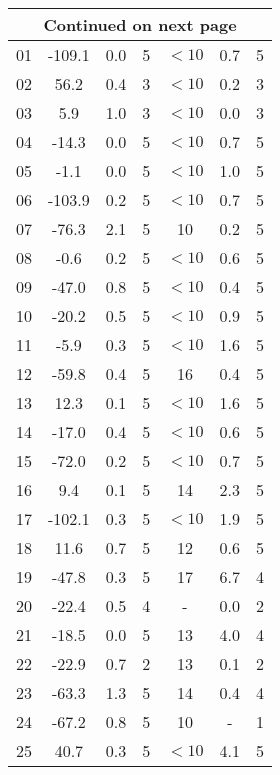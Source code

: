 \begin{longtable}{ccccccc}
\hline \multicolumn{7}{c}{{Continued on next page}} \\ \hline
\endfoot
\hline \hline
\endfoot
\rowcolor[gray]{0.9} 01 & -109.1 & 0.0 & 5 & $<10$ & 0.7 & 5\\
\rowcolor[gray]{0.9} 02 & 56.2 & 0.4 & 3 & $<10$ & 0.2 & 3\\
\rowcolor[gray]{0.9} 03 & 5.9 & 1.0 & 3 & $<10$ & 0.0 & 3\\
\rowcolor[gray]{0.9} 04 & -14.3 & 0.0 & 5 & $<10$ & 0.7 & 5\\
\rowcolor[gray]{0.9} 05 & -1.1 & 0.0 & 5 & $<10$ & 1.0 & 5\\
\rowcolor[gray]{0.9} 06 & -103.9 & 0.2 & 5 & $<10$ & 0.7 & 5\\
\rowcolor[gray]{0.9} 07 & -76.3 & 2.1 & 5 & 10 & 0.2 & 5\\
\rowcolor[gray]{0.9} 08 & -0.6 & 0.2 & 5 & $<10$ & 0.6 & 5\\
\rowcolor[gray]{0.9} 09 & -47.0 & 0.8 & 5 & $<10$ & 0.4 & 5\\
\rowcolor[gray]{0.9} 10 & -20.2 & 0.5 & 5 & $<10$ & 0.9 & 5\\
\rowcolor[gray]{0.9} 11 & -5.9 & 0.3 & 5 & $<10$ & 1.6 & 5\\
\rowcolor[gray]{0.9} 12 & -59.8 & 0.4 & 5 & 16 & 0.4 & 5\\
\rowcolor[gray]{0.9} 13 & 12.3 & 0.1 & 5 & $<10$ & 1.6 & 5\\
\rowcolor[gray]{0.9} 14 & -17.0 & 0.4 & 5 & $<10$ & 0.6 & 5\\
\rowcolor[gray]{0.9} 15 & -72.0 & 0.2 & 5 & $<10$ & 0.7 & 5\\
\rowcolor[gray]{0.9} 16 & 9.4 & 0.1 & 5 & 14 & 2.3 & 5\\
\rowcolor[gray]{0.9} 17 & -102.1 & 0.3 & 5 & $<10$ & 1.9 & 5\\
\rowcolor[gray]{0.9} 18 & 11.6 & 0.7 & 5 & 12 & 0.6 & 5\\
\rowcolor[gray]{0.9} 19 & -47.8 & 0.3 & 5 & 17 & 6.7 & 4\\
20 & -22.4 & 0.5 & 4 & - & 0.0 & 2\\
\rowcolor[gray]{0.9} 21 & -18.5 & 0.0 & 5 & 13 & 4.0 & 4\\
\rowcolor[gray]{0.9} 22 & -22.9 & 0.7 & 2 & 13 & 0.1 & 2\\
\rowcolor[gray]{0.9} 23 & -63.3 & 1.3 & 5 & 14 & 0.4 & 4\\
24 & -67.2 & 0.8 & 5 & 10 & - & 1\\
\rowcolor[gray]{0.9} 25 & 40.7 & 0.3 & 5 & $<10$ & 4.1 & 5\\

\end{longtable}
